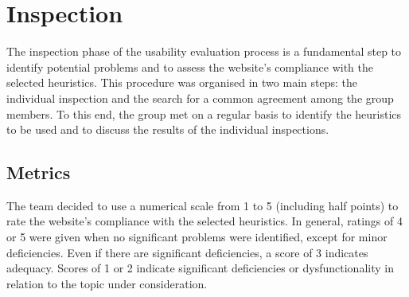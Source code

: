 \section{Inspection}
The inspection phase of the usability evaluation process is a fundamental step to identify potential problems and to assess the website's compliance with the selected heuristics. 
This procedure was organised in two main steps: the individual inspection and the search for a common agreement among the group members.
To this end, the group met on a regular basis to identify the heuristics to be used and to discuss the results of the individual inspections.

\subsection{Metrics}
The team decided to use a numerical scale from 1 to 5 (including half points) to rate the website's compliance with the selected heuristics.
In general, ratings of 4 or 5 were given when no significant problems were identified, except for minor deficiencies. 
Even if there are significant deficiencies, a score of 3 indicates adequacy. 
Scores of 1 or 2 indicate significant deficiencies or dysfunctionality in relation to the topic under consideration.

